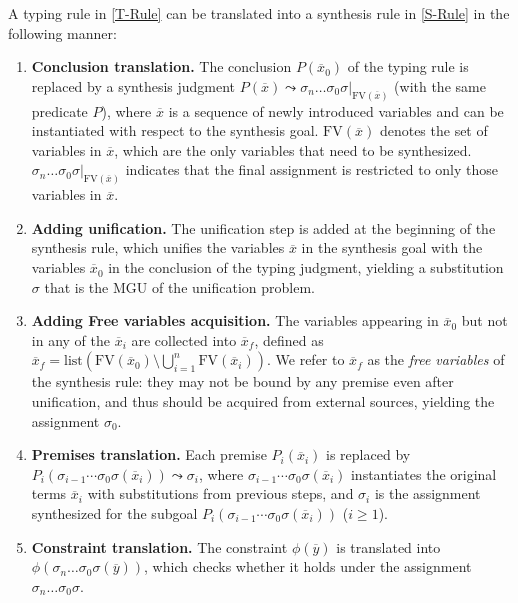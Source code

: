 \documentclass[manuscript,screen]{acmart}
\newcommand{\ensure}[1]{#1} %
\newcommand{\mvhzc}{\text{FV}}
\begin{document}
A typing rule in \autoref{T-Rule} can be translated into a synthesis rule in \autoref{S-Rule} in the following manner:
\begin{enumerate}
  \item \textbf{Conclusion translation.} The conclusion $P(\overline{x}_0)$ of the typing rule is replaced by a synthesis judgment $P(\overline{x}) \leadsto \sigma_n \ldots \sigma_0 \sigma|_{\mvhzc(\overline{x})}$ (with the same predicate $P$), where $\overline{x}$ is a sequence of newly introduced variables and can be instantiated with respect to the synthesis goal. $\mvhzc(\overline{x})$ denotes the set of variables in $\overline{x}$, which are the only variables that need to be synthesized. 
  $\sigma_n \ldots \sigma_0 \sigma|_{\mvhzc(\overline{x})}$ indicates that the final assignment is restricted to only those variables in $\overline{x}$.

  \item \textbf{Adding unification.} The unification step is added at the beginning of the synthesis rule, which unifies the variables $\overline{x}$ in the synthesis goal with the variables $\overline{x}_0$ in the conclusion of the typing judgment, yielding a substitution $\sigma$ that is the MGU of the unification problem. 

  \item \textbf{Adding Free variables acquisition.} The variables appearing in $\overline{x}_0$ but not in any of the $\overline{x}_i$ are collected into $\overline{x}_f$, defined as $\overline{x}_f = \text{list}(\mvhzc(\overline{x}_0) \setminus \bigcup_{i=1}^n \mvhzc(\overline{x}_i))$. We refer to $\overline{x}_f$ as the \emph{free variables} of the synthesis rule: they may not be bound by any premise even after unification, and thus should be acquired from external sources, yielding the assignment $\sigma_0$.

  \item \textbf{Premises translation.} Each premise $P_i(\overline{x}_i)$ is replaced by $P_i(\sigma_{i-1} \cdots \sigma_0 \sigma(\overline{x}_i)) \leadsto \sigma_i$, where $\sigma_{i-1} \cdots \sigma_0 \sigma(\overline{x}_i)$ instantiates the original terms $\overline{x}_i$ with substitutions from previous steps, and $\sigma_i$ is the assignment synthesized for the subgoal $P_i(\sigma_{i-1} \cdots \sigma_0 \sigma(\overline{x}_i))$ ($i\geq1$).

  \item \textbf{Constraint translation.} The constraint $\phi(\overline{y})$ is translated into $\ensure{\phi(\sigma_n \ldots \sigma_0 \sigma(\overline{y}))}$, which checks whether it holds under the assignment $\sigma_n \ldots \sigma_0 \sigma$.    
\end{enumerate}
\end{document}

